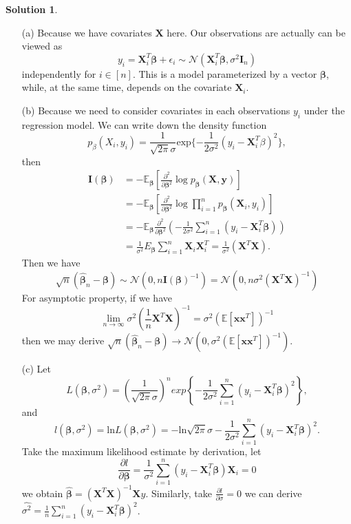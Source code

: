 \documentclass[11pt,letterpaper,english,oneside]{article} %
\theoremstyle{definition} %
\newtheorem{solution}{Solution}
\newenvironment{sol}{\begin{solution}\hspace{0pt}}{\end{solution}}
\begin{document}
    \begin{sol}
    \begin{itemize}
        \item[(a)] Because we have covariates $\bm X$ here. Our observations are actually can be viewed as
        $$
            y_i = \bm X_i^T \bm \beta + \epsilon_i \sim \mathcal{N}(\bm X_i^T \bm \beta, \sigma^2 \bm I_n)
        $$
        independently for $i \in [n]$. This is a model parameterized by a vector $\bm \beta$, while, at the same time, depends on the covariate $\bm X_i$.
        \item[(b)] Because we need to consider covariates in each observations $y_i$ under the regression model. We can
        write down the density function
        $$
            p_\beta(X_i, y_i) = \frac{1}{\sqrt{2 \pi}\sigma}\text{exp}\{-\frac{1}{2\sigma^2}(y_i - \bm X_i^T \beta)^2\},
        $$
        then 
        \begin{align*}
            \bm I(\bm \beta) &= -\mathbb E_{\bm \beta}\left[\frac{\partial^2}{\partial \bm \beta^2} \log p_{\bm \beta}(\bm X, \bm y) \right] \\
            &= -\mathbb E_{ \bm \beta}\left[\frac{\partial^2}{\partial \bm \beta^2} \log \prod_{i=1}^n p_{\bm \beta}(\bm X_i,  y_i) \right] \\
            &= -\mathbb E_{ \bm \beta}\frac{\partial^2}{\partial \bm \beta^2}\left( -\frac{1}{2 \sigma^2} \sum_{i=1}^n (y_i - \bm X_i^T \bm \beta) \right) \\
            &= \frac{1}{\sigma^2} E_{ \bm \beta} \sum_{i=1}^n \bm X_i \bm X_i^T = \frac{1}{\sigma^2}(\bm X^T \bm X).
        \end{align*}
        Then we have 
        $$
            \sqrt{n}(\hat{\bm \beta}_n - \bm \beta) \sim \mathcal{N}(0, n\bm I (\bm \beta)^{-1}) = \mathcal{N}(0, n\sigma^2(\bm X^T \bm X)^{-1})
        $$
        For asymptotic property, if we have
        $$
           \lim_{n \rightarrow \infty}\sigma^2(\frac{1}{n}\bm X^T \bm X)^{-1} =  \sigma^2 (\mathbb E [\bm x \bm x^T ])^{-1}
        $$
        then we may derive $\sqrt{n}(\hat{\bm \beta}_n - \bm \beta) \rightarrow \mathcal{N}(0, \sigma^2 (\mathbb E [\bm x \bm x^T])^{-1})$.

    \item[(c)] Let
    $$
        L(\bm \beta, \sigma^2) = \left(\frac{1}{\sqrt{2 \pi}\sigma}\right)^n exp\left\{-\frac{1}{2\sigma^2}\sum_{i=1}^n(y_i - \bm X_i^T \bm \beta)^2\right\},
    $$
    and
    $$
        l(\bm \beta, \sigma^2) = \text{ln}L(\bm \beta, \sigma^2) = - \text{ln} \sqrt{2 \pi} \sigma - \frac{1}{2\sigma^2} \sum_{i=1}^n (y_i - \bm X_i^T \bm \beta)^2.
    $$
    Take the maximum likelihood estimate by derivation, let
    $$
        \frac{\partial l}{\partial \bm \beta} = \frac{1}{\sigma^2} \sum_{i=1}^n (y_i - \bm X_i^T \bm \beta) \bm X_i = 0
    $$
    we obtain $\hat{\bm \beta} = (\bm X^T \bm X)^{-1} \bm X y$. Similarly, take  $
        \frac{\partial l}{\partial \sigma} = 0
    $
    we can derive $\widehat{\sigma^2} = \frac{1}{n}\sum_{i=1}^n(y_i - \bm X_i^T \bm \beta)^2$.


\end{itemize}
\end{sol}
\end{document}
